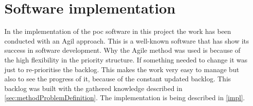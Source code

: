 \section{Software implementation}\label{sec:methodSoftwareImplementation}
In the implementation of the \acrshort{poc} software in this project the work has been conducted with an Agil approach. 
This is a well-known software that has show its success in software development. \cite{DoesAgileWork2015}
Why the Agile method was used is because of the high flexibility in the priority structure.
If something needed to change it was just to re-prioritise the backlog.
This makes the work very easy to manage but also to see the progress of it, because of the constant updated backlog.
This backlog was built with the gathered knowledge described in  \cref{sec:methodProblemDefinition}.
The implementation is being described in \cref{impl}.

\bigskip

